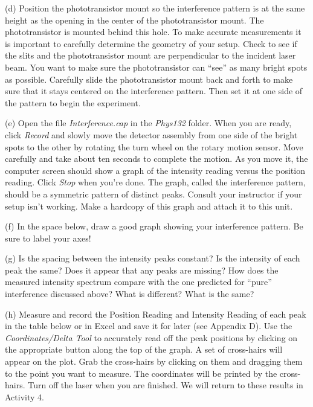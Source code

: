 (d) Position the phototransistor mount so the interference pattern
is at the same height as the opening in the center of the phototransistor mount. 
The phototransistor is mounted behind this hole. 
To make accurate measurements it is important to carefully determine the geometry of your setup. 
Check to see if the slits and the phototransistor mount are perpendicular to the incident
laser beam.  You want to make sure the phototransistor can {}``see'' as many
bright spots as possible. Carefully slide the phototransistor mount 
back and forth to make sure that it stays centered on the interference pattern. 
Then set it at one side of the pattern to begin the experiment.

(e) Open the file {\it Interference.cap} in the {\it Phys132} folder. 
When you are ready, click {\it Record} and slowly move the
detector assembly from one side of the bright spots to the other by rotating the turn wheel on the rotary motion
sensor. Move carefully and take about ten seconds to complete the motion. As you move it, the computer screen
should show a graph of the intensity reading versus the position reading. Click {\it Stop} when you’re done. The
graph, called the interference pattern, should be a symmetric pattern of distinct peaks. Consult your instructor
if your setup isn’t working.
Make a hardcopy of this graph and attach it to this unit.

(f) In the space below, draw a good graph showing your interference pattern. Be sure to label your axes!
\vspace{25mm}

(g) Is the spacing between the intensity peaks constant? Is the intensity
of each peak the same? Does it appear that any peaks are missing?
How does the measured intensity spectrum compare with the one predicted
for {}``pure'' interference discussed above? What is different?
What is the same?
\vspace{30mm}

(h) Measure and record the Position Reading and Intensity Reading
of each peak in the table below or in Excel and save it for later (see Appendix D).
Use the
{\it Coordinates/Delta Tool} to accurately read off the peak positions by clicking on the
appropriate button along the top of the graph. A set of cross-hairs will appear on the
plot. Grab the cross-hairs by clicking on them and dragging them to the point you want
to measure.
The coordinates will be printed by the cross-hairs.
Turn off the laser when you are finished.
We will return to these results in Activity 4.

